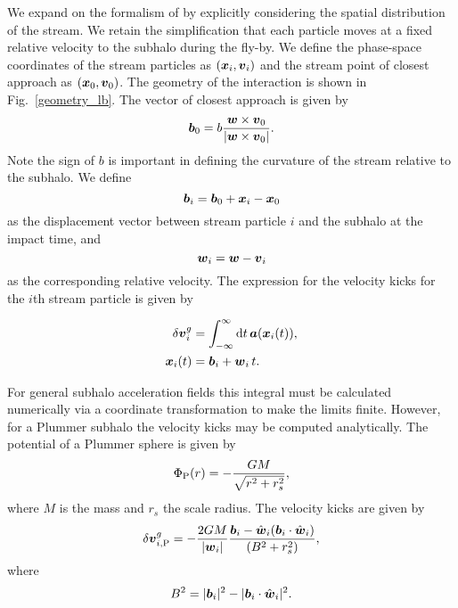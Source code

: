 \documentclass[useAMS,usenatbib,fleqn,a4paper]{mn2e}
\newcommand{\bs}[1]{\bmath{#1}}
\begin{document}
We expand on the formalism of \cite{ErkalBelokurov2015} by explicitly considering the spatial distribution of the stream. We retain the simplification that each particle moves at a fixed relative velocity to the subhalo during the fly-by. We define the phase-space coordinates of the stream particles as $(\bs{x}_i,\bs{v}_i)$ and the stream point of closest approach as $(\bs{x}_0,\bs{v}_0)$. The geometry of the interaction is shown in Fig.~\ref{geometry_lb}. The vector of closest approach is given by
\begin{equation}
\bs{b}_0=b\frac{\bs{w}\times\bs{v}_0}{|\bs{w}\times\bs{v}_0|}.
\end{equation}
Note the sign of $b$ is important in defining the curvature of the stream relative to the subhalo. We define
\begin{equation}
\bs{b}_i = \bs{b}_0+\bs{x}_i-\bs{x}_0
\end{equation}
as the displacement vector between stream particle $i$ and the subhalo at the impact time, and
\begin{equation}
\bs{w}_i=\bs{w}-\bs{v}_i
\end{equation}
as the corresponding relative velocity. The expression for the velocity kicks for the $i$th stream particle is given by

\begin{equation}
\begin{split}
\delta\bs{v}^g_i &= \int_{-\infty}^{\infty} \mathrm{d} t\,\bs{a}(\bs{x}_i(t)),\\
\bs{x}_i(t)&=\bs{b}_i+\bs{w}_i\,t.
\end{split}
\end{equation}

For general subhalo acceleration fields this integral must be calculated numerically via a coordinate transformation to make the limits finite. However, for a Plummer subhalo the velocity kicks may be computed analytically. The potential of a Plummer sphere is given by
\begin{equation}
\Phi_{\rm P}(r) = -\frac{GM}{\sqrt{r^2+r_s^2}},
\end{equation}
where $M$ is the mass and $r_s$ the scale radius. The velocity kicks are given by
\begin{equation}
\delta\bs{v}^{g}_{i,\mathrm{P}} = -\frac{2GM}{|\bs{w}_i|}
\frac{\bs{b}_i-\hat{\bs{w}}_i(\bs{b}_i\cdot\hat{\bs{w}}_i)}
{(B^2+r_s^2)},
\label{curved}
\end{equation}
where
\begin{equation}
B^2=|\bs{b}_i|^2
-|\bs{b}_i\cdot\hat{\bs{w}}_i|^2.
\end{equation}
\end{document}
